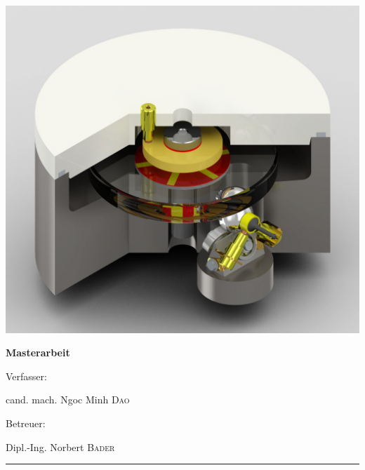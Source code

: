 \begin{center}
    \includegraphics[width=0.8\linewidth]{./images/ehd_pruefstand.jpg}
\end{center}

\vspace{1cm}

\begin{center}
    {\textbf{\Large Masterarbeit}}\\[1cm]
\end{center}

\vfill

\begin{minipage}[t]{0.5\textwidth}
    \begin{flushleft}
        Verfasser:

        cand. mach. Ngoc Minh \textsc{Dao}
    \end{flushleft}
\end{minipage}
%
\begin{minipage}[t]{0.5\textwidth}
    \begin{flushright}
        Betreuer:

        Dipl.-Ing. Norbert \textsc{Bader}
    \end{flushright}
\end{minipage}

\rule{\textwidth}{1pt}

